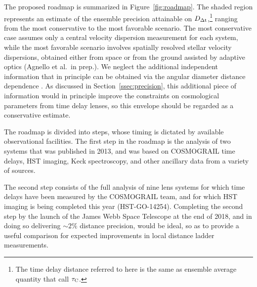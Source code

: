 The proposed roadmap is summarized in Figure~\ref{fig:roadmap}. The
shaded region represents an estimate of the ensemble precision attainable on
$D_{\Delta{\rm t}}$,\footnote{The time delay distance referred to here is the same as
ensemble average quantity that \citet{C+M09b} call $\mathcal{\tau}_{\rm C}$.}
ranging from the most conservative to the most favorable
scenario. The most conservative case assumes only a central velocity
dispersion measurement for each system, while the most favorable
scenario involves spatially resolved stellar velocity dispersions,
obtained either from space or from the ground assisted by adaptive optics
(Agnello et al.\ in prep.). We neglect the additional independent
information that in principle can be obtained via the angular
diameter distance dependence \citep{JeeEtal2016}.  As
discussed in Section~\ref{ssec:precision}, this additional piece of
information would in principle improve the constraints on cosmological
parameters from time delay lenses, so this envelope should be regarded
as a conservative estimate.

The roadmap is divided into steps, whose timing is dictated by
available observational facilities.
The first step in the roadmap is the analysis
of two systems that was published in 2013, and was based on COSMOGRAIL time
delays, HST imaging, Keck spectroscopy, and other ancillary data from
a variety of sources.

The second step consists of the full analysis of nine lens systems for
which time delays have been measured by the COSMOGRAIL team, and for
which HST imaging is being completed this year (HST-GO-14254).
Completing the second step by the launch of the James Webb Space
Telescope at the end of 2018, and in doing so delivering $\sim2\%$
distance precision, would be ideal, so as to provide a useful
comparison for expected improvements in local distance ladder
measurements.


